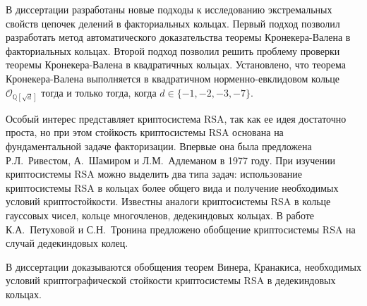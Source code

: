 \documentclass[_00_autoref.tex]{subfiles}
\begin{document}
В диссертации разработаны новые подходы к исследованию экстремальных свойств цепочек делений в факториальных кольцах.
Первый подход позволил разработать метод автоматического доказательства теоремы Кронекера-Валена в факториальных кольцах.
Второй подход позволил решить проблему проверки теоремы Кронекера-Валена в квадратичных кольцах.
Установлено, что теорема Кронекера-Валена выполняется в квадратичном норменно-евклидовом кольце $\mathcal{O}_{\mathbb{Q}[\sqrt{d}]}$ тогда и только тогда, когда $d \in \{-1, -2, -3, -7\}$.

Особый интерес представляет криптосистема RSA, так как ее идея достаточно проста, но при этом стойкость криптосистемы RSA основана на фундаментальной задаче факторизации.
Впервые она была предложена Р.Л.~Ривестом, А.~Шамиром и Л.М.~Адлеманом в 1977 году.
При изучении криптосистемы RSA можно выделить два типа задач: использование криптосистемы RSA в кольцах более общего вида и получение необходимых условий криптостойкости.
Известны аналоги криптосистемы RSA в кольце гауссовых чисел, кольце многочленов, дедекиндовых кольцах.
В работе К.А.~Петуховой и С.Н.~Тронина предложено обобщение криптосистемы RSA на случай дедекиндовых колец.

В диссертации доказываются обобщения теорем Винера, Кранакиса, необходимых условий криптографической стойкости криптосистемы RSA в дедекиндовых кольцах.
\end{document}
